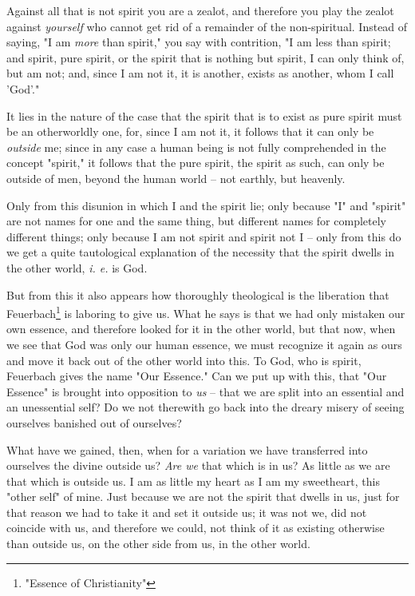 \documentclass[a4paper]{book}
\begin{document}
Against all that is not spirit you are a zealot, and therefore you play the 
zealot against \textit{yourself} who cannot get rid of a remainder of the 
non-spiritual. Instead of saying, "{}I am \textit{more} than spirit,"{} you 
say with contrition, "{}I am less than spirit; and spirit, pure spirit, or the 
spirit that is nothing but spirit, I can only think of, but am not; and, since 
I am not it, it is another, exists as another, whom I call 'God'."{}

It lies in the nature of the case that the spirit that is to exist as pure 
spirit must be an otherworldly one, for, since I am not it, it follows that it 
can only be \textit{outside} me; since in any case a human being is not fully 
comprehended in the concept "{}spirit,"{} it follows that the pure spirit, the 
spirit as such, can only be outside of men, beyond the human world -- not 
earthly, but heavenly.

Only from this disunion in which I and the spirit lie; only because "{}I"{} 
and "{}spirit"{} are not names for one and the same thing, but different names 
for completely different things; only because I am not spirit and spirit not I 
-- only from this do we get a quite tautological explanation of the necessity 
that the spirit dwells in the other world, \textit{i. e.} is God.

But from this it also appears how thoroughly theological is the liberation 
that Feuerbach\footnote{"{}Essence of Christianity"{}} is laboring to give us. 
What he says is that we had only mistaken our own essence, and therefore 
looked for it in the other world, but that now, when we see that God was only 
our human essence, we must recognize it again as ours and move it back out of 
the other world into this. To God, who is spirit, Feuerbach gives the name 
"{}Our Essence."{} Can we put up with this, that "{}Our Essence"{} is brought 
into opposition to \textit{us} -- that we are split into an essential and an 
unessential self? Do we not therewith go back into the dreary misery of seeing 
ourselves banished out of ourselves?

What have we gained, then, when for a variation we have transferred into 
ourselves the divine outside us? \textit{Are we} that which is in us? As 
little as we are that which is outside us. I am as little my heart as I am my 
sweetheart, this "{}other self"{} of mine. Just because we are not the spirit 
that dwells in us, just for that reason we had to take it and set it outside 
us; it was not we, did not coincide with us, and therefore we could, not think 
of it as existing otherwise than outside us, on the other side from us, in the 
other world.
\end{document}

